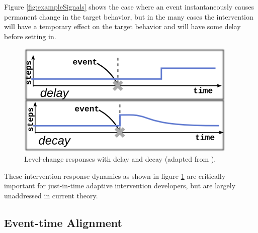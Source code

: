\documentclass[review,journal]{vgtc}         %
\begin{document}
Figure \ref{fig:exampleSignals} shows the case where an event instantaneously causes permanent change in the target behavior, but in the many cases the intervention will have a temporary effect on the target behavior and will have some delay before setting in.

\begin{figure}
\centering
\includegraphics[width=0.6\columnwidth]{./img/exampleDynamicComplications.png}
\caption{Level-change responses with delay and decay (adapted from \cite{glass1975}).}
\label{fig:exampleComplications}
\end{figure}

These intervention response dynamics as shown in figure \ref{fig:exampleComplications} are critically important for just-in-time adaptive intervention developers, but are largely unaddressed in current theory.

\subsection{Event-time Alignment}
\end{document}
